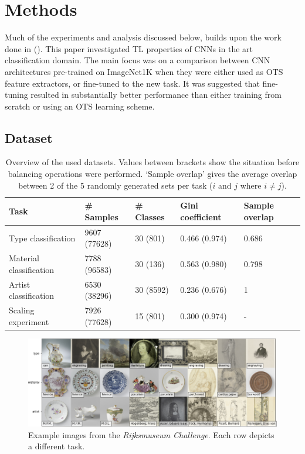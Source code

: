 \section{Methods}

Much of the experiments and analysis discussed below, builds upon the work done in \citeauthor{sabatelli2018deep} (\citeyear{sabatelli2018deep}). This paper investigated TL properties of CNNs in the art classification domain. The main focus was on a comparison between CNN architectures pre-trained on ImageNet1K when they were either used as OTS feature extractors, or fine-tuned to the new task. It was suggested that fine-tuning resulted in substantially better performance than either training from scratch or using an OTS learning scheme.

\subsection{Dataset} \label{methods:dataset}

\begin{table}[tb]
\centering
\small
\begin{tabular}{lllll}
\hline
\textbf{Task} & \textbf{\# Samples} & \textbf{\# Classes} & \textbf{Gini coefficient} & \textbf{Sample overlap} \\ \hline
Type classification & 9607 (77628) & 30 (801) & 0.466 (0.974) & 0.686 \\
Material classification & 7788 (96583) & 30 (136) & 0.563 (0.980) & 0.798 \\
Artist classification & 6530 (38296) & 30 (8592) & 0.236 (0.676) & 1 \\
Scaling experiment & 7926 (77628) & 15 (801) & 0.300 (0.974) & - \\ \hline
\end{tabular}
\caption{Overview of the used datasets. Values between brackets show the situation before balancing operations were performed. `Sample overlap' gives the average overlap between 2 of the 5 randomly generated sets per task ($i$ and $j$ where $i \neq j$).}
\label{methods:datasets}
\end{table}

\begin{figure}[bt]
\includegraphics[width=\textwidth]{img/examples.png}
\caption{Example images from the \textit{Rijksmuseum Challenge}. Each row depicts a different task.}
\label{methods:eg}
\end{figure}

